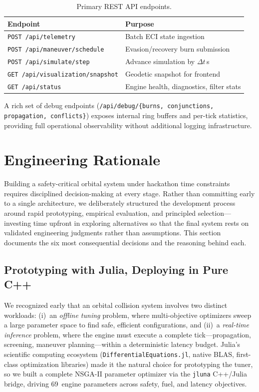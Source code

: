 \documentclass[10pt,twocolumn,letterpaper]{article}
\begin{document}
\begin{table}[h]
\centering\small
\begin{tabularx}{\linewidth}{@{}lX@{}}
\toprule
\textbf{Endpoint} & \textbf{Purpose} \\
\midrule
\texttt{POST /api/telemetry}       & Batch ECI state ingestion \\
\texttt{POST /api/maneuver/schedule} & Evasion/recovery burn submission \\
\texttt{POST /api/simulate/step}    & Advance simulation by $\Delta t$\,s \\
\texttt{GET /api/visualization/snapshot} & Geodetic snapshot for frontend \\
\texttt{GET /api/status}            & Engine health, diagnostics, filter stats \\
\bottomrule
\end{tabularx}
\caption{Primary REST API endpoints.}
\label{tab:api}
\end{table}

\noindent
A rich set of debug endpoints (\texttt{/api/debug/\{burns, conjunctions,
propagation, conflicts\}}) exposes internal ring buffers and per-tick
statistics, providing full operational observability without additional
logging infrastructure.

\section{Engineering Rationale}\label{sec:decisions}

Building a safety-critical orbital system under hackathon time constraints
requires disciplined decision-making at every stage.  Rather than
committing early to a single architecture, we deliberately structured the
development process around rapid prototyping, empirical evaluation, and
principled selection---investing time upfront in exploring alternatives so
that the final system rests on validated engineering judgments rather than
assumptions.  This section documents the six most consequential decisions
and the reasoning behind each.

\subsection{Prototyping with Julia, Deploying in Pure C++}

We recognized early that an orbital collision system involves two distinct
workloads: (i)~an \emph{offline tuning} problem, where multi-objective
optimizers sweep a large parameter space to find safe, efficient
configurations, and (ii)~a \emph{real-time inference} problem, where the
engine must execute a complete tick---propagation, screening, maneuver
planning---within a deterministic latency budget.  Julia's scientific
computing ecosystem (\texttt{DifferentialEquations.jl}, native BLAS,
first-class optimization libraries) made it the natural choice for
prototyping the tuner, so we built a complete NSGA-II parameter optimizer
via the \texttt{jluna} C++/Julia bridge, driving 69~engine parameters
across safety, fuel, and latency objectives.
\end{document}
